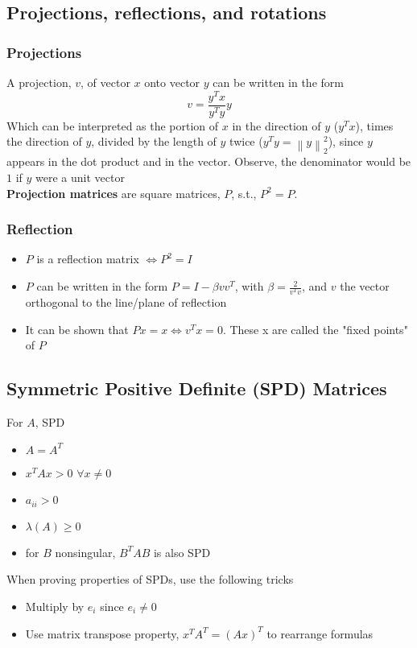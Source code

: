 \documentclass{article}
\newcommand{\norm}[2]{\left\lVert#1\right\rVert_#2}
\begin{document}
\subsection{Projections, reflections, and rotations}
\subsubsection{Projections}
A projection, $v$, of vector $x$ onto vector $y$ can be written in the form
\begin{equation*}
    v = \frac{y^Tx}{y^Ty}y
\end{equation*}
Which can be interpreted as the portion of $x$ in the direction of $y$ ($y^Tx$), times the direction of $y$, divided by the length of $y$ twice ($y^Ty = \norm{y}{2}^2$), since $y$ appears in the dot product and in the vector. Observe, the denominator would be $1$ if $y$ were a unit vector\\

\noindent \textbf{Projection matrices} are square matrices, $P$, s.t., $P^2 = P$. 

\subsubsection{Reflection}
\begin{itemize}
    \item $P$ is a reflection matrix $\Leftrightarrow P^2 = I$
    \item $P$ can be written in the form $P = I - \beta vv^T$, with $\beta = \frac{2}{v^Tv}$, and $v$ the vector orthogonal to the line/plane of reflection
    \item It can be shown that $Px = x \Leftrightarrow v^Tx = 0$. These x are called the "fixed points" of $P$
\end{itemize}

\subsection{Symmetric Positive Definite (SPD) Matrices}
For $A$, SPD
\begin{itemize}
    \item $A = A^T$
    \item $x^TAx > 0$  $\forall x \neq 0$
    \item $a_{ii} > 0$
    \item $\lambda(A) \geq 0$
    \item for $B$ nonsingular, $B^TAB$ is also SPD
\end{itemize}
When proving properties of SPDs, use the following tricks
\begin{itemize}
    \item Multiply by $e_i$ since $e_i \neq 0$
    \item Use matrix transpose property, $x^TA^T = (Ax)^T$ to rearrange formulas
\end{itemize}
\end{document}
